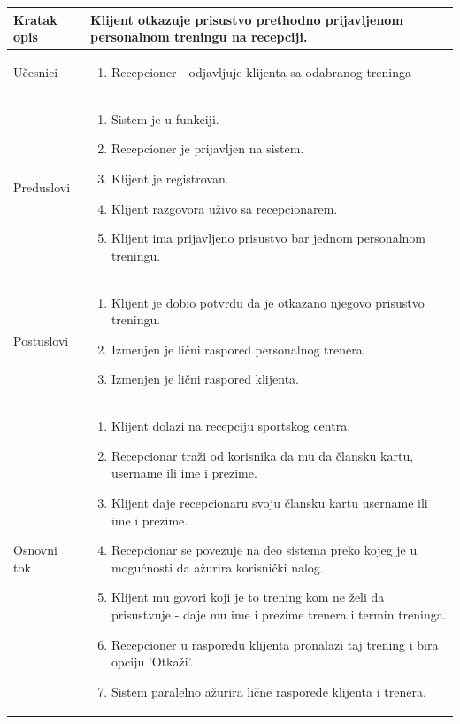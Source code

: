 \begin{longtable}{| p{} | p{} |} 
\hline
    Kratak opis & Klijent otkazuje prisustvo prethodno prijavljenom personalnom treningu na recepciji. \\ 
\hline    
    Učesnici &
    \begin{enumerate}
    \item Recepcioner - odjavljuje klijenta sa odabranog treninga
   \end{enumerate}\\
\hline
   Preduslovi & \begin{enumerate}
    \item Sistem je u funkciji.
    \item Recepcioner je prijavljen na sistem.
    \item Klijent je registrovan.
    \item Klijent razgovora uživo sa recepcionarem.
    \item Klijent ima prijavljeno prisustvo bar jednom personalnom treningu.
   \end{enumerate} \\
\hline  
    Postuslovi &
    \begin{enumerate}
    \item Klijent je dobio potvrdu da je otkazano njegovo prisustvo treningu.
    \item Izmenjen je lični raspored personalnog trenera.
    \item Izmenjen je lični raspored klijenta.
   \end{enumerate}\\
\hline
    Osnovni tok & 
    \begin{enumerate}
    \item Klijent dolazi na recepciju sportskog centra.
    \item Recepcionar traži od korisnika da mu da člansku kartu, username ili ime i prezime.
    \item Klijent daje recepcionaru svoju člansku kartu username ili ime i prezime.
    \item Recepcionar se povezuje na deo sistema preko kojeg je u mogućnosti da ažurira korisnički nalog.
    \item Klijent mu govori koji je to trening kom ne želi da prisustvuje - daje mu ime i prezime trenera i termin treninga.
    \item Recepcioner u rasporedu klijenta pronalazi taj trening i bira opciju 'Otkaži'.
    \item Sistem paralelno ažurira lične rasporede klijenta i trenera.

\end{enumerate}
\end{longtable}
